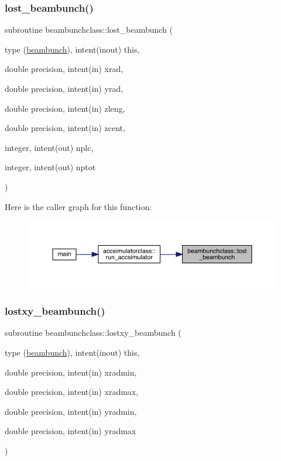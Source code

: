 \subsubsection{\texorpdfstring{lost\_beambunch()}{lost\_beambunch()}}
{\footnotesize\ttfamily subroutine beambunchclass\+::lost\+\_\+beambunch (\begin{DoxyParamCaption}\item[{type (\mbox{\hyperlink{namespacebeambunchclass_structbeambunchclass_1_1beambunch}{beambunch}}), intent(inout)}]{this,  }\item[{double precision, intent(in)}]{xrad,  }\item[{double precision, intent(in)}]{yrad,  }\item[{double precision, intent(in)}]{zleng,  }\item[{double precision, intent(in)}]{zcent,  }\item[{integer, intent(out)}]{nplc,  }\item[{integer, intent(out)}]{nptot }\end{DoxyParamCaption})}

Here is the caller graph for this function\+:\nopagebreak
\begin{figure}[H]
\begin{center}
\leavevmode
\includegraphics[width=350pt]{namespacebeambunchclass_a7cccd378d69c7b51808b6d96d3151e50_icgraph}
\end{center}
\end{figure}
\mbox{\label{namespacebeambunchclass_a68be93e06f8b6c65ee45af2e08610396}} 
\subsubsection{\texorpdfstring{lostxy\_beambunch()}{lostxy\_beambunch()}}
{\footnotesize\ttfamily subroutine beambunchclass\+::lostxy\+\_\+beambunch (\begin{DoxyParamCaption}\item[{type (\mbox{\hyperlink{namespacebeambunchclass_structbeambunchclass_1_1beambunch}{beambunch}}), intent(inout)}]{this,  }\item[{double precision, intent(in)}]{xradmin,  }\item[{double precision, intent(in)}]{xradmax,  }\item[{double precision, intent(in)}]{yradmin,  }\item[{double precision, intent(in)}]{yradmax }\end{DoxyParamCaption})}

